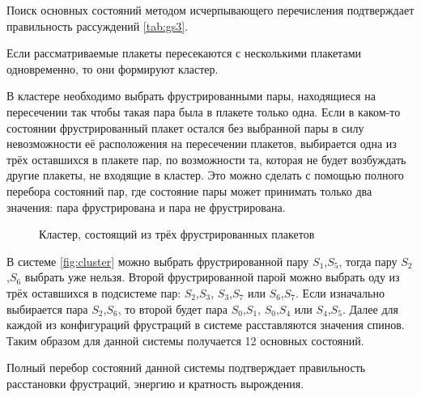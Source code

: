 \documentclass[utf8, babel, sor, jor, amsmath, amssymb, reprint]{elsarticle} %
\begin{document}
Поиск основных состояний методом исчерпывающего перечисления подтверждает правильность рассуждений \eqref{tab:gs3}.

Если рассматриваемые плакеты пересекаются с несколькими плакетами одновременно, то они формируют кластер.

В кластере необходимо выбрать фрустрированными пары, находящиеся на пересечении так чтобы такая пара была в плакете только одна. Если в каком-то состоянии фрустрированный плакет остался без выбранной пары в силу невозможности её расположения на пересечении плакетов, выбирается одна из трёх оставшихся в плакете пар, по возможности та, которая не будет возбуждать другие плакеты, не входящие в кластер. Это можно сделать с помощью полного перебора состояний пар, где состояние пары может принимать только два значения: пара фрустрирована и пара не фрустрирована.

\begin{figure}[H]
	\centering
	\caption{Кластер, состоящий из трёх фрустрированных плакетов}
	\label{fig:cluster}
\end{figure}

В системе \eqref{fig:cluster}  можно выбрать фрустрированной пару $S_1$,$S_5$, тогда пару  $S_2$,$S_6$ выбрать уже нельзя. Второй фрустрированной парой можно выбрать оду из трёх оставшихся в подсистеме пар: $S_2$,$S_3$, $S_3$,$S_7$ или $S_6$,$S_7$. Если изначально выбирается пара $S_2$,$S_6$, то второй будет пара $S_0$,$S_1$, $S_0$,$S_4$ или $S_4$,$S_5$. Далее для каждой из конфигураций фрустраций в системе расставляются значения спинов. Таким образом для данной системы получается 12 основных состояний. 

Полный перебор состояний данной системы подтверждает правильность расстановки фрустраций, энергию и кратность вырождения.
\end{document}
